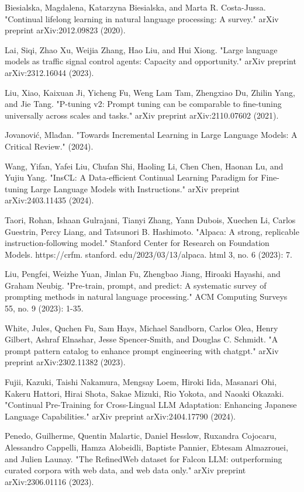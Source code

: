 \documentclass[runningheads]{llncs}
\begin{document}
\begin{thebibliography}{8}
Biesialska, Magdalena, Katarzyna Biesialska, and Marta R. Costa-Jussa. "Continual lifelong learning in natural language processing: A survey." arXiv preprint arXiv:2012.09823 (2020).

Lai, Siqi, Zhao Xu, Weijia Zhang, Hao Liu, and Hui Xiong. "Large language models as traffic signal control agents: Capacity and opportunity." arXiv preprint arXiv:2312.16044 (2023).

Liu, Xiao, Kaixuan Ji, Yicheng Fu, Weng Lam Tam, Zhengxiao Du, Zhilin Yang, and Jie Tang. "P-tuning v2: Prompt tuning can be comparable to fine-tuning universally across scales and tasks." arXiv preprint arXiv:2110.07602 (2021).

Jovanović, Mlađan. "Towards Incremental Learning in Large Language Models: A Critical Review." (2024).

Wang, Yifan, Yafei Liu, Chufan Shi, Haoling Li, Chen Chen, Haonan Lu, and Yujiu Yang. "InsCL: A Data-efficient Continual Learning Paradigm for Fine-tuning Large Language Models with Instructions." arXiv preprint arXiv:2403.11435 (2024).

Taori, Rohan, Ishaan Gulrajani, Tianyi Zhang, Yann Dubois, Xuechen Li, Carlos Guestrin, Percy Liang, and Tatsunori B. Hashimoto. "Alpaca: A strong, replicable instruction-following model." Stanford Center for Research on Foundation Models. https://crfm. stanford. edu/2023/03/13/alpaca. html 3, no. 6 (2023): 7.

Liu, Pengfei, Weizhe Yuan, Jinlan Fu, Zhengbao Jiang, Hiroaki Hayashi, and Graham Neubig. "Pre-train, prompt, and predict: A systematic survey of prompting methods in natural language processing." ACM Computing Surveys 55, no. 9 (2023): 1-35.

White, Jules, Quchen Fu, Sam Hays, Michael Sandborn, Carlos Olea, Henry Gilbert, Ashraf Elnashar, Jesse Spencer-Smith, and Douglas C. Schmidt. "A prompt pattern catalog to enhance prompt engineering with chatgpt." arXiv preprint arXiv:2302.11382 (2023).

Fujii, Kazuki, Taishi Nakamura, Mengsay Loem, Hiroki Iida, Masanari Ohi, Kakeru Hattori, Hirai Shota, Sakae Mizuki, Rio Yokota, and Naoaki Okazaki. "Continual Pre-Training for Cross-Lingual LLM Adaptation: Enhancing Japanese Language Capabilities." arXiv preprint arXiv:2404.17790 (2024).

Penedo, Guilherme, Quentin Malartic, Daniel Hesslow, Ruxandra Cojocaru, Alessandro Cappelli, Hamza Alobeidli, Baptiste Pannier, Ebtesam Almazrouei, and Julien Launay. "The RefinedWeb dataset for Falcon LLM: outperforming curated corpora with web data, and web data only." arXiv preprint arXiv:2306.01116 (2023).


\end{thebibliography}
\end{document}
